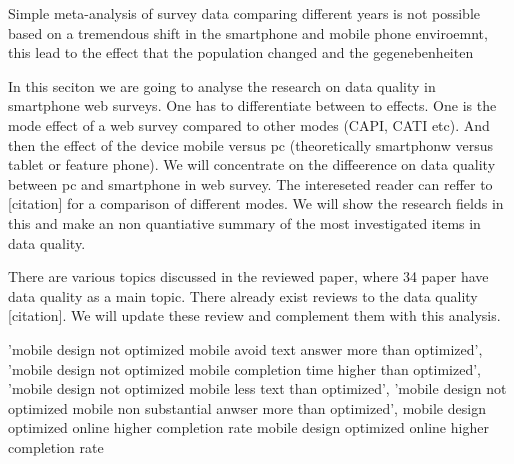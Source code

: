 Simple meta-analysis of survey data comparing different years is not possible based on a tremendous shift in the smartphone and mobile phone enviroemnt, this lead to the effect that the population changed and the gegenebenheiten

In this seciton we are going to analyse the research on data quality in smartphone web surveys. One has to differentiate between to effects. One is the mode effect of a web survey compared to other modes (CAPI, CATI etc). And then the effect of the device mobile versus pc (theoretically smartphonw versus tablet or feature phone). We will concentrate on the diffeerence on data quality between pc and smartphone in web survey. The intereseted reader can reffer to [citation] for a comparison of different modes. We will show the research fields in this and make an non quantiative summary of the most investigated items in data quality. 

There are various topics discussed in the reviewed paper, where 34 paper have data quality as a main topic. There already exist reviews to the data quality [citation]. We will update these review and complement them with this analysis. 

 'mobile design not optimized mobile avoid text answer more than optimized',
 'mobile design not optimized mobile completion time higher than optimized',
 'mobile design not optimized mobile less text than optimized',
 'mobile design not optimized mobile non substantial anwser more than optimized',
 mobile design optimized online higher completion rate
 mobile design optimized online higher completion rate


